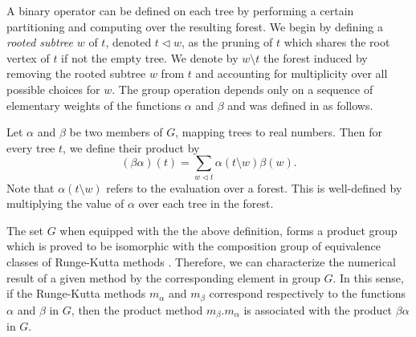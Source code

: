 A binary operator can be defined on each tree by performing a certain partitioning and computing over the resulting forest.  We begin by defining a \emph{rooted subtree} $w$ of $t$, denoted $t \lhd w$, as the pruning of $t$ which shares the root vertex of $t$ if not the empty tree.  We denote by $w \setminus t$ the forest induced by removing the rooted subtree $w$ from $t$ and accounting for multiplicity over all possible choices for $w$. %
The group operation depends only on a sequence of elementary weights of the functions $\alpha$ and $\beta$ and was defined in \cite{Butcher2008_book} as follows.
\begin{definition}\label{def:Group_operation}
	Let $\alpha$ and $\beta$ be two members of $G$, mapping trees to real numbers. Then for every tree $t$, we define their product by
	\begin{equation}\label{eq:Group_operation}
		(\beta\alpha)(t) = \sum_{w \lhd t}\alpha(t \setminus w)\beta(w).
	\end{equation}
	Note that $\alpha(t \setminus w)$ refers to the evaluation over a forest. This is well-defined by multiplying the value of $\alpha$ over each tree in the forest.
\end{definition}
The set $G$ when equipped with the the above definition, forms a product group which is proved to be isomorphic with the composition group of equivalence classes of Runge-Kutta methods \cite{Butcher1972, Butcher1987_book}. Therefore, we can characterize the numerical result of a given method by the corresponding element in group $G$. In this sense, if the Runge-Kutta methods $m_\alpha$ and $m_\beta$ correspond respectively to the functions $\alpha$ and $\beta$ in $G$, then the product method $m_\beta.m_\alpha$ is associated with the product $\beta\alpha$ in $G$.
